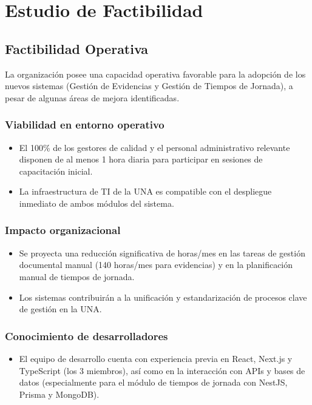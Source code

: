 \section{Estudio de Factibilidad}

\subsection{Factibilidad Operativa}
La organización posee una capacidad operativa favorable para la adopción de los nuevos sistemas (Gestión de Evidencias y Gestión de Tiempos de Jornada), a pesar de algunas áreas de mejora identificadas.
\subsubsection{Viabilidad en entorno operativo}
\begin{itemize}
    \item El 100\% de los gestores de calidad y el personal administrativo relevante disponen de al menos 1 hora diaria para participar en sesiones de capacitación inicial.
    \item La infraestructura de TI de la UNA es compatible con el despliegue inmediato de ambos módulos del sistema.
\end{itemize}

\subsubsection{Impacto organizacional}
\begin{itemize}
    \item Se proyecta una reducción significativa de horas/mes en las tareas de gestión documental manual (140 horas/mes para evidencias) y en la planificación manual de tiempos de jornada.
    \item Los sistemas contribuirán a la unificación y estandarización de procesos clave de gestión en la UNA.
\end{itemize}

\subsubsection{Conocimiento de desarrolladores}
\begin{itemize}
    \item El equipo de desarrollo cuenta con experiencia previa en React, Next.js y TypeScript (los 3 miembros), así como en la interacción con APIs y bases de datos (especialmente para el módulo de tiempos de jornada con NestJS, Prisma y MongoDB).
\end{itemize}

